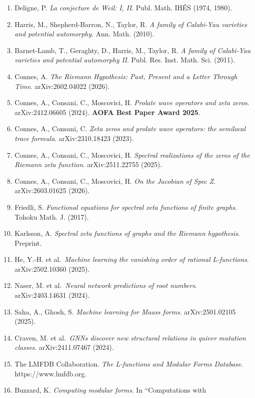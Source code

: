 \documentclass[
]{article}
\providecommand{\tightlist}{%
  \setlength{\itemsep}{0pt}\setlength{\parskip}{0pt}}
\begin{document}
\begin{enumerate}
\def\labelenumi{\arabic{enumi}.}
\tightlist
\item
  Deligne, P. \emph{La conjecture de Weil: I, II}. Publ. Math. IHÉS
  (1974, 1980).
\item
  Harris, M., Shepherd-Barron, N., Taylor, R. \emph{A family of
  Calabi-Yau varieties and potential automorphy}. Ann. Math. (2010).
\item
  Barnet-Lamb, T., Geraghty, D., Harris, M., Taylor, R. \emph{A family
  of Calabi-Yau varieties and potential automorphy II}. Publ. Res. Inst.
  Math. Sci. (2011).
\item
  Connes, A. \emph{The Riemann Hypothesis: Past, Present and a Letter
  Through Time}. arXiv:2602.04022 (2026).
\item
  Connes, A., Consani, C., Moscovici, H. \emph{Prolate wave operators
  and zeta zeros}. arXiv:2412.06605 (2024). \textbf{AOFA Best Paper
  Award 2025}.
\item
  Connes, A., Consani, C. \emph{Zeta zeros and prolate wave operators:
  the semilocal trace formula}. arXiv:2310.18423 (2023).
\item
  Connes, A., Consani, C., Moscovici, H. \emph{Spectral realizations of
  the zeros of the Riemann zeta function}. arXiv:2511.22755 (2025).
\item
  Connes, A., Consani, C., Moscovici, H. \emph{On the Jacobian of Spec
  Z}. arXiv:2603.01625 (2026).
\item
  Friedli, S. \emph{Functional equations for spectral zeta functions of
  finite graphs}. Tohoku Math. J. (2017).
\item
  Karlsson, A. \emph{Spectral zeta functions of graphs and the Riemann
  hypothesis}. Preprint.
\item
  He, Y.-H. et al.~\emph{Machine learning the vanishing order of
  rational L-functions}. arXiv:2502.10360 (2025).
\item
  Naser, M. et al.~\emph{Neural network predictions of root numbers}.
  arXiv:2403.14631 (2024).
\item
  Saha, A., Ghosh, S. \emph{Machine learning for Maass forms}.
  arXiv:2501.02105 (2025).
\item
  Craven, M. et al.~\emph{GNNs discover new structural relations in
  quiver mutation classes}. arXiv:2411.07467 (2024).
\item
  The LMFDB Collaboration. \emph{The L-functions and Modular Forms
  Database}. https://www.lmfdb.org.
\item
  Buzzard, K. \emph{Computing modular forms}. In ``Computations with

\end{enumerate}
\end{document}
